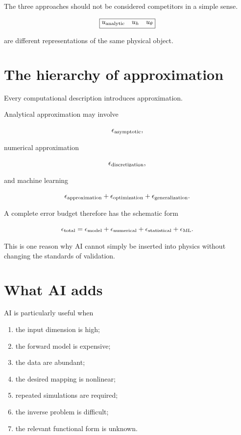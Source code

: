 \documentclass[11pt,a4paper,oneside]{book}
\begin{document}
The three approaches should not be considered competitors in a simple sense.

\begin{equation}
\boxed{
u_{\rm analytic}
\quad
u_h
\quad
u_\theta
}
\end{equation}

are different representations of the same physical object.

\section{The hierarchy of approximation}

Every computational description introduces approximation.

Analytical approximation may involve

\begin{equation}
\epsilon_{\rm asymptotic},
\end{equation}

numerical approximation

\begin{equation}
\epsilon_{\rm discretization},
\end{equation}

and machine learning

\begin{equation}
\epsilon_{\rm approximation}
+
\epsilon_{\rm optimization}
+
\epsilon_{\rm generalization}.
\end{equation}

A complete error budget therefore has the schematic form

\begin{equation}
\epsilon_{\rm total}
=
\epsilon_{\rm model}
+
\epsilon_{\rm numerical}
+
\epsilon_{\rm statistical}
+
\epsilon_{\rm ML}.
\end{equation}

This is one reason why AI cannot simply be inserted into physics without
changing the standards of validation.

\section{What AI adds}

AI is particularly useful when

\begin{enumerate}
\item the input dimension is high;
\item the forward model is expensive;
\item the data are abundant;
\item the desired mapping is nonlinear;
\item repeated simulations are required;
\item the inverse problem is difficult;
\item the relevant functional form is unknown.
\end{enumerate}
\end{document}
